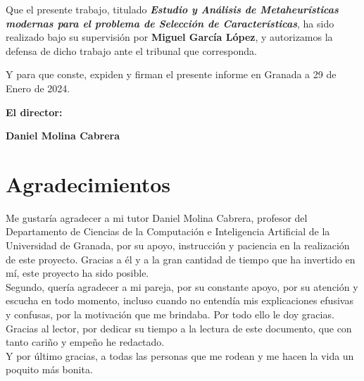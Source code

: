 Que el presente trabajo, titulado \textit{\textbf{Estudio y Análisis de Metaheurísticas modernas para el problema de Selección de Características}},
ha sido realizado bajo su supervisión por \textbf{Miguel García López}, y autorizamos la defensa de dicho trabajo ante el tribunal
que corresponda.

\vspace{0.5cm}

Y para que conste, expiden y firman el presente informe en Granada a 29 de Enero de 2024.

\vspace{1cm}

\textbf{El director:}

\vspace{5cm}

\noindent \textbf{Daniel Molina Cabrera}

\chapter*{Agradecimientos}
\thispagestyle{empty}

\vspace{1cm}


Me gustaría agradecer a mi tutor Daniel Molina Cabrera, profesor del Departamento de Ciencias de la Computación e Inteligencia Artificial de la Universidad de Granada, por su apoyo, instrucción y paciencia en la realización de este proyecto. Gracias a él y a la gran cantidad de tiempo que ha invertido en mí, este proyecto ha sido posible.\\[6pt] 
Segundo, quería agradecer a mi pareja, por su constante apoyo, por su atención y escucha en todo momento, incluso cuando no entendía mis explicaciones efusivas y confusas, por la motivación que me brindaba. Por todo ello le doy gracias.\\[6pt]
Gracias al lector, por dedicar su tiempo a la lectura de este documento, que con tanto cariño y empeño he redactado.\\[6pt]
Y por último gracias, a todas las personas que me rodean y me hacen la vida un poquito más bonita.\\[6pt]
